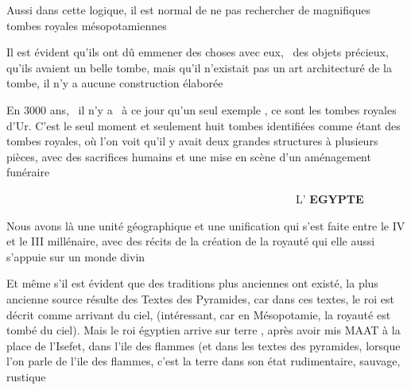 \documentclass[a4paper]{article}
\begin{document}
\bigskip

{
Aussi dans cette logique, il est normal de ne pas rechercher de
magnifiques tombes royales mésopotamiennes}

{
Il est évident qu'ils ont dû emmener des choses avec eux, \ des objets
précieux, qu'ils avaient un belle tombe, mais qu'il n'existait pas un
art architecturé de la tombe, il n'y a aucune construction élaborée}

{
En 3000 ans, \ il n'y a \ à ce jour qu'un seul exemple , ce sont les
tombes royales d'Ur. C'est le seul moment et seulement huit tombes
identifiées comme étant des tombes royales, où l'on voit qu'il y avait
deux grandes structures à plusieurs pièces, avec des sacrifices humains
et une mise en scène d'un aménagement funéraire}


\bigskip


\bigskip


\bigskip


\bigskip


\bigskip


\bigskip


\bigskip


\bigskip


\bigskip


\bigskip


\bigskip


\bigskip


\bigskip


\bigskip


\bigskip


\bigskip


\bigskip

{
\ \ \ \ \ \ \ \ \ \ \ \ \ \ \ \ \ \ \ \ \ \ \ \ \ \ \ \ \ \ \ \ \ \ \ \ \ \ \ \ \ \ \ \ \ \ \ \ \ \ \ \ L'\textbf{
EGYPTE}}


\bigskip


\bigskip

{
Nous avons là une unité géographique et une unification qui s'est faite
entre le IV et le III millénaire, avec des récits de la création de la
royauté qui elle aussi s'appuie sur un monde divin}

{
Et même s'il est évident que des traditions plus anciennes ont existé,
la plus ancienne source résulte des Textes des Pyramides, car dans ces
textes, le roi est décrit comme arrivant du ciel, (intéressant, car en
Mésopotamie, la royauté est tombé du ciel). Mais le roi égyptien arrive
sur terre , après avoir mis MAAT à la place de l'Isefet, dans l'ile des
flammes (et dans les textes des pyramides, lorsque l'on parle de l'ile
des flammes, c'est la terre dans son état rudimentaire, sauvage,
rustique}
\end{document}
